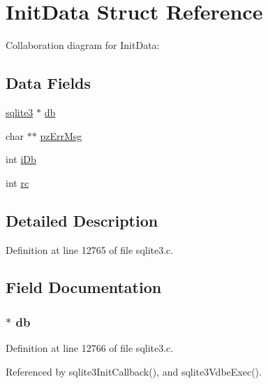 \hypertarget{struct_init_data}{}\section{Init\+Data Struct Reference}
\label{struct_init_data}


Collaboration diagram for Init\+Data\+:
\subsection*{Data Fields}
\begin{DoxyCompactItemize}
\item 
\hyperlink{structsqlite3}{sqlite3} $\ast$ \hyperlink{struct_init_data_ad6e663497d2c934364b3bcf07496b30b}{db}
\item 
char $\ast$$\ast$ \hyperlink{struct_init_data_ad89b7fe8878cfda3ea65d2a13c77d546}{pz\+Err\+Msg}
\item 
int \hyperlink{struct_init_data_ad5da55f1bf334f91b2f63a6a63be348b}{i\+Db}
\item 
int \hyperlink{struct_init_data_ac6509c6fe4cbf7bde170597172f8a288}{rc}
\end{DoxyCompactItemize}


\subsection{Detailed Description}


Definition at line 12765 of file sqlite3.\+c.



\subsection{Field Documentation}
\hypertarget{struct_init_data_ad6e663497d2c934364b3bcf07496b30b}{}
\subsubsection[{db}]{$\ast$ db}\label{struct_init_data_ad6e663497d2c934364b3bcf07496b30b}


Definition at line 12766 of file sqlite3.\+c.



Referenced by sqlite3\+Init\+Callback(), and sqlite3\+Vdbe\+Exec().

\hypertarget{struct_init_data_ad5da55f1bf334f91b2f63a6a63be348b}{}
